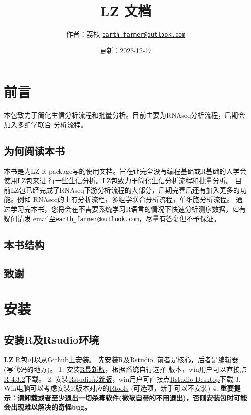 \documentclass[
]{book}
\title{LZ 文档}
\author{作者：荔枝 \href{mailto:earth_farmer@outlook.com}{\nolinkurl{earth\_farmer@outlook.com}}}
\date{更新：2023-12-17}
\begin{document}
\maketitle

{
\setcounter{tocdepth}{1}
\tableofcontents
}
\chapter*{前言}\label{ux524dux8a00}

本包致力于简化生信分析流程和批量分析。目前主要为RNAseq分析流程，后期会加入多组学联合
分析流程。

\section*{为何阅读本书}\label{ux4e3aux4f55ux9605ux8bfbux672cux4e66}

本书是为LZ R package写的使用文档。旨在让完全没有编程基础或R基础的人学会使用LZ包来进
行一些生信分析。LZ包致力于简化生信分析流程和批量分析。
目前LZ包已经完成了RNAseq下游分析流程的大部分，后期完善后还有加入更多的功能。例如
RNAseq的上有分析流程，多组学联合分析流程，单细胞分析流程。
通过学习完本书，您将会在不需要系统学习R语言的情况下快速分析测序数据，如有疑问请发
email至\texttt{earth\_farmer@outlook.com}，尽量有答复但不予保证。

\section*{本书结构}\label{ux672cux4e66ux7ed3ux6784}

\section*{致谢}\label{ux81f4ux8c22}

\chapter{安装}\label{install}

\section{安装R及Rsudio环境}\label{ux5b89ux88c5rux53carsudioux73afux5883}

\textbf{LZ} R包可以从Github上安装。
先安装R及Rstudio, 前者是核心，后者是编辑器(写代码的地方)。
1. 安装\href{https://mirrors.tuna.tsinghua.edu.cn/CRAN/bin/}{R最新版}，根据系统自行选择
版本，win用户可以直接点\href{https://mirrors.tuna.tsinghua.edu.cn/CRAN/bin/windows/base/R-4.3.2-win.exe}{R-4.3.2}下载。
2. 安装\href{https://posit.co/download/rstudio-desktop/}{Rstudio最新版}，win用户可直接点\href{https://download1.rstudio.org/electron/windows/RStudio-2023.09.1-494.exe}{Rstudio Desktop}下载
3. Win电脑可以考虑安装R版本对应的\href{https://cran.r-project.org/bin/windows/Rtools/}{Rtools} (可选项，新手可以不安装)
4. \textbf{重要提示：请卸载或者至少退出一切杀毒软件(微软自带的不用退出)，否则安装包时可能会出现难以解决的奇怪bug。}
\end{document}
